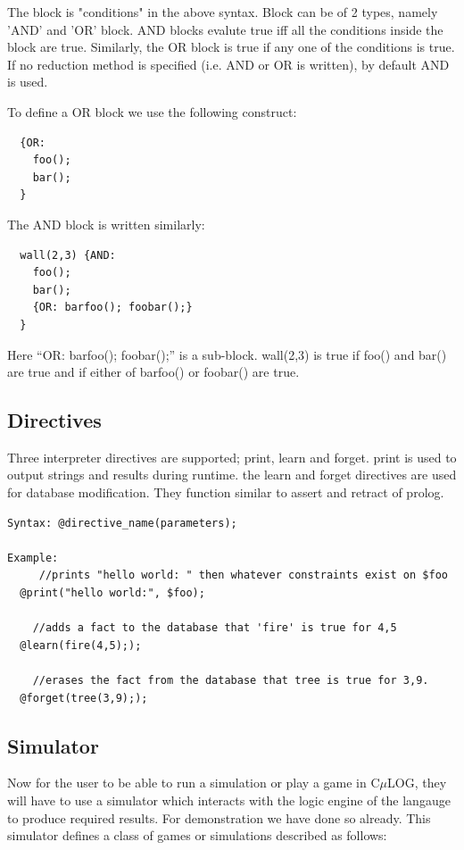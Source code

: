 \documentclass[onecolumn,titlepage]{article}
\begin{document}
The block is "{conditions}" in the above syntax. Block can be of 2
types, namely 'AND' and 'OR' block. AND blocks evalute true iff all
the conditions inside the block are true. Similarly, the OR block is
true if any one of the conditions is true. If no reduction method is
specified (i.e. AND or OR is written), by default AND is used.

To define a OR block we use the following construct:

\begin{verbatim}
  {OR:
    foo();
    bar();
  }
\end{verbatim}

The AND block is written similarly:

\begin{verbatim}
  wall(2,3) {AND:
    foo();
    bar();
    {OR: barfoo(); foobar();}
  }
\end{verbatim}

Here ``{OR: barfoo(); foobar();}'' is a sub-block. wall(2,3) is
true if foo() and bar() are true and if either of barfoo() or foobar()
are true.

\subsection{Directives}
Three interpreter directives are supported; print, learn and
forget. print is used to output strings and results during
runtime. the learn and forget directives are used for database
modification. They function similar to assert and retract of prolog.

\begin{verbatim}
Syntax: @directive_name(parameters);

Example:
     //prints "hello world: " then whatever constraints exist on $foo
  @print("hello world:", $foo);

    //adds a fact to the database that 'fire' is true for 4,5
  @learn(fire(4,5););

    //erases the fact from the database that tree is true for 3,9.
  @forget(tree(3,9););
\end{verbatim}

\subsection{Simulator}

Now for the user to be able to run a simulation or play a game in
C$\mu$LOG, they will have to use a simulator which interacts with the
logic engine of the langauge to produce required results. For
demonstration we have done so already. This simulator defines a class
of games or simulations described as follows:
\end{document}
